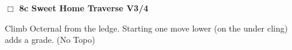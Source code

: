 \begin{multicols}{2}
\begin{adjustwidth}{0.5cm}{}
\needspace{2em}
\label{vr:Sweet Home Traverse}
\colorbox{RoyalBlue!20}{
\parbox{0.95\linewidth}{
\hspace{-1ex}\textbf{$\Box$
8c Sweet Home Traverse V3/4  
}}}
\begin{adjustwidth}{1.3em}{}			

Climb Octernal from the ledge. Starting one move lower (on the under cling) adds a grade.
  (No Topo)
\end{adjustwidth}



\end{adjustwidth}
	\end{multicols}
\label{tp:Methlab Backside}
  \begin{landscape}
	
  \end{landscape}

